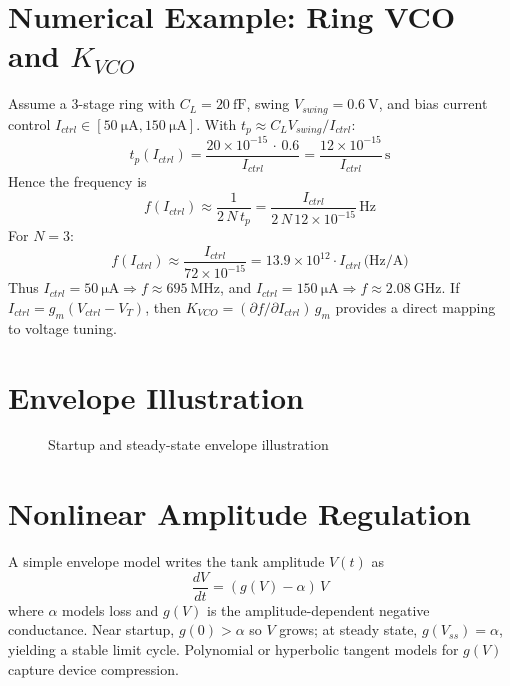 \section{Numerical Example: Ring VCO and \(K_{VCO}\)}
Assume a 3-stage ring with \(C_L = \SI{20}{\femto\farad}\), swing \(V_{swing} = \SI{0.6}{\volt}\), and bias current control \(I_{ctrl} \in [\SI{50}{\micro\ampere}, \SI{150}{\micro\ampere}]\). With \(t_p \approx C_L V_{swing}/I_{ctrl}\):
\[
t_p(I_{ctrl}) = \frac{20\times 10^{-15}\,\cdot\,0.6}{I_{ctrl}} = \frac{12\times 10^{-15}}{I_{ctrl}}\,\text{s}
\]
Hence the frequency is
\[
f(I_{ctrl}) \approx \frac{1}{2\,N\,t_p} = \frac{I_{ctrl}}{2\,N\,12\times 10^{-15}}\,\text{Hz}
\]
For \(N=3\):
\[
f(I_{ctrl}) \approx \frac{I_{ctrl}}{72\times 10^{-15}} = 13.9\times 10^{12}\cdot I_{ctrl}\,\text{(Hz/A)}
\]
Thus \(I_{ctrl}=\SI{50}{\micro\ampere}\Rightarrow f\approx \SI{695}{\mega\hertz}\), and \(I_{ctrl}=\SI{150}{\micro\ampere}\Rightarrow f\approx \SI{2.08}{\giga\hertz}\). If \(I_{ctrl} = g_m (V_{ctrl}-V_T)\), then \(K_{VCO} = (\partial f/\partial I_{ctrl})\,g_m\) provides a direct mapping to voltage tuning.

\section{Envelope Illustration}
\begin{figure}[H]
  \centering
  \caption{Startup and steady-state envelope illustration}
\end{figure}

\section{Nonlinear Amplitude Regulation}
A simple envelope model writes the tank amplitude \(V(t)\) as
\[
\frac{dV}{dt} = (g(V) - \alpha)\,V
\]
where \(\alpha\) models loss and \(g(V)\) is the amplitude-dependent negative conductance. Near startup, \(g(0) > \alpha\) so \(V\) grows; at steady state, \(g(V_{ss}) = \alpha\), yielding a stable limit cycle. Polynomial or hyperbolic tangent models for \(g(V)\) capture device compression.

